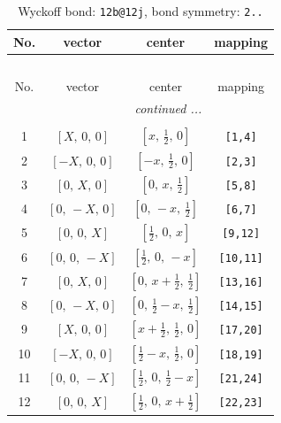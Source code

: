 \documentclass[fleqn,8pt]{jsarticle}
\begin{document}
\renewcommand{\arraystretch}{1.2}
\begin{longtable}{cccc}
\caption{Wyckoff bond: {\tt 12b@12j}, bond symmetry: {\tt 2..}}
 \\
 \hline \hline
No. & vector & center & mapping \\ \hline \endfirsthead

\multicolumn{3}{l}{\tablename\ \thetable{}} \\
 \hline \hline
No. & vector & center & mapping \\ \hline \endhead

 \hline \hline
\multicolumn{3}{r}{\footnotesize\it continued ...} \\ \endfoot

 \hline \hline
\multicolumn{3}{r}{} \\ \endlastfoot

1 & $\left[ X,\, 0,\, 0 \right]$ & $\left[ x,\, \frac{1}{2},\, 0 \right]$ & {\tt [1,4]} \\ \hline
2 & $\left[ - X,\, 0,\, 0 \right]$ & $\left[ - x,\, \frac{1}{2},\, 0 \right]$ & {\tt [2,3]} \\ \hline
3 & $\left[ 0,\, X,\, 0 \right]$ & $\left[ 0,\, x,\, \frac{1}{2} \right]$ & {\tt [5,8]} \\ \hline
4 & $\left[ 0,\, - X,\, 0 \right]$ & $\left[ 0,\, - x,\, \frac{1}{2} \right]$ & {\tt [6,7]} \\ \hline
5 & $\left[ 0,\, 0,\, X \right]$ & $\left[ \frac{1}{2},\, 0,\, x \right]$ & {\tt [9,12]} \\ \hline
6 & $\left[ 0,\, 0,\, - X \right]$ & $\left[ \frac{1}{2},\, 0,\, - x \right]$ & {\tt [10,11]} \\ \hline
7 & $\left[ 0,\, X,\, 0 \right]$ & $\left[ 0,\, x + \frac{1}{2},\, \frac{1}{2} \right]$ & {\tt [13,16]} \\ \hline
8 & $\left[ 0,\, - X,\, 0 \right]$ & $\left[ 0,\, \frac{1}{2} - x,\, \frac{1}{2} \right]$ & {\tt [14,15]} \\ \hline
9 & $\left[ X,\, 0,\, 0 \right]$ & $\left[ x + \frac{1}{2},\, \frac{1}{2},\, 0 \right]$ & {\tt [17,20]} \\ \hline
10 & $\left[ - X,\, 0,\, 0 \right]$ & $\left[ \frac{1}{2} - x,\, \frac{1}{2},\, 0 \right]$ & {\tt [18,19]} \\ \hline
11 & $\left[ 0,\, 0,\, - X \right]$ & $\left[ \frac{1}{2},\, 0,\, \frac{1}{2} - x \right]$ & {\tt [21,24]} \\ \hline
12 & $\left[ 0,\, 0,\, X \right]$ & $\left[ \frac{1}{2},\, 0,\, x + \frac{1}{2} \right]$ & {\tt [22,23]} \\
\end{longtable}
\end{document}
